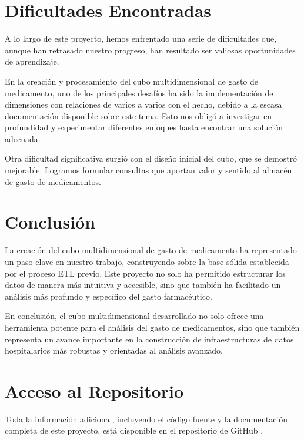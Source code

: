 \documentclass{article}
\begin{document}
	 \section{Dificultades Encontradas}
	 A lo largo de este proyecto, hemos enfrentado una serie de dificultades que, aunque han retrasado nuestro progreso, han resultado ser valiosas oportunidades de aprendizaje. 
	 
	 En la creación y procesamiento del cubo multidimensional de gasto de medicamento, uno de los principales desafíos ha sido la implementación de dimensiones con relaciones de varios a varios con el hecho, debido a la escasa documentación disponible sobre este tema. Esto nos obligó a investigar en profundidad y experimentar diferentes enfoques hasta encontrar una solución adecuada.
	 
	 Otra dificultad significativa surgió con el diseño inicial del cubo, que se demostró mejorable. Logramos formular consultas que aportan valor y sentido al almacén de gasto de medicamentos. 
	 
	 \section{Conclusión}
	 \label{sec:conclusion}
	 
	 La creación del cubo multidimensional de gasto de medicamento ha representado un paso clave en nuestro trabajo, construyendo sobre la base sólida establecida por el proceso ETL previo. Este proyecto no solo ha permitido estructurar los datos de manera más intuitiva y accesible, sino que también ha facilitado un análisis más profundo y específico del gasto farmacéutico.
	 
	 En conclusión, el cubo multidimensional desarrollado no solo ofrece una herramienta potente para el análisis del gasto de medicamentos, sino que también representa un avance importante en la construcción de infraestructuras de datos hospitalarios más robustas y orientadas al análisis avanzado.
	 
	\newpage
	\section{Acceso al Repositorio}
	
	Toda la información adicional, incluyendo el código fuente y la documentación completa de este proyecto, está disponible en el repositorio de GitHub \cite{silva2024github}.
	
	
\end{document}
